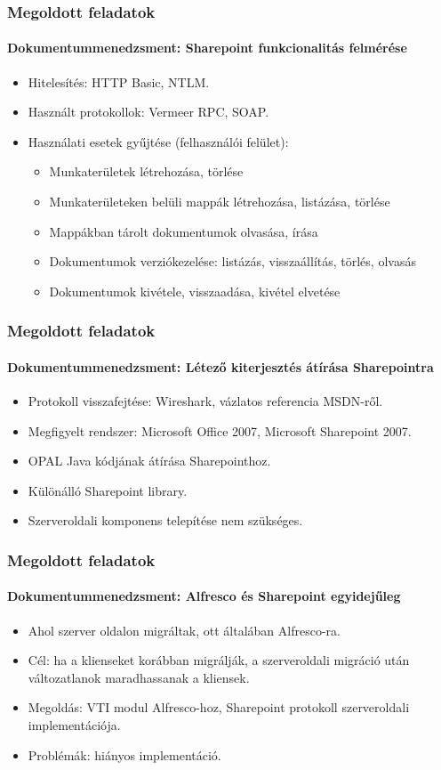 \documentclass{beamer}
\begin{document}
\begin{frame}
\frametitle{Megoldott feladatok}
\framesubtitle{Dokumentummenedzsment: Sharepoint funkcionalitás felmérése}
\begin{itemize}
\item Hitelesítés: HTTP Basic, NTLM.
\item Használt protokollok: Vermeer RPC, SOAP.
\item Használati esetek gyűjtése (felhasználói felület):
\begin{itemize}
\item Munkaterületek létrehozása, törlése
\item Munkaterületeken belüli mappák létrehozása, listázása, törlése
\item Mappákban tárolt dokumentumok olvasása, írása
\item Dokumentumok verziókezelése: listázás, visszaállítás, törlés, olvasás
\item Dokumentumok kivétele, visszaadása, kivétel elvetése
\end{itemize}
\end{itemize}
\end{frame}

\begin{frame}
\frametitle{Megoldott feladatok}
\framesubtitle{Dokumentummenedzsment: Létező kiterjesztés átírása Sharepointra}
\begin{itemize}
\item Protokoll visszafejtése: Wireshark, vázlatos referencia MSDN-ről.
\item Megfigyelt rendszer: Microsoft Office 2007, Microsoft Sharepoint 2007.
\item OPAL Java kódjának átírása Sharepointhoz.
\item Különálló Sharepoint library.
\item Szerveroldali komponens telepítése nem szükséges.
\end{itemize}
\end{frame}

\begin{frame}
\frametitle{Megoldott feladatok}
\framesubtitle{Dokumentummenedzsment: Alfresco és Sharepoint egyidejűleg}
\begin{itemize}
\item Ahol szerver oldalon migráltak, ott általában Alfresco-ra.
\item Cél: ha a klienseket korábban migrálják, a szerveroldali migráció után változatlanok maradhassanak a kliensek.
\item Megoldás: VTI modul Alfresco-hoz, Sharepoint protokoll szerveroldali implementációja.
\item Problémák: hiányos implementáció.
\end{itemize}
\end{frame}
\end{document}
